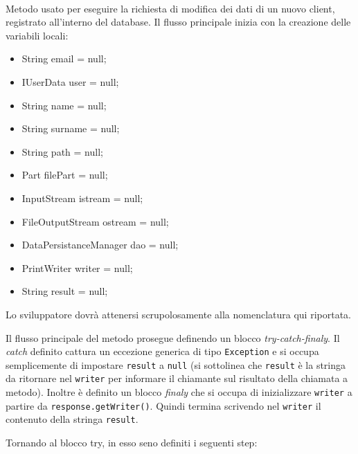 \begin{description}
	\item{}\\	
	Metodo usato per eseguire la richiesta di modifica dei dati di un nuovo client, registrato all'interno del database. Il flusso principale inizia con la creazione delle variabili locali:

\begin{itemize}
\item String email = null;
\item IUserData user = null;
\item String name = null;
\item String surname = null;
\item String path = null;
\item Part filePart = null;
\item InputStream istream = null;
\item FileOutputStream ostream = null;
\item DataPersistanceManager dao = null;
\item PrintWriter writer = null;
\item String result = null;
\end{itemize}	

Lo sviluppatore dovrà attenersi scrupolosamente alla nomenclatura qui riportata.

Il flusso principale del metodo prosegue definendo un blocco \textit{try-catch-finaly}. Il \textit{catch} definito cattura un eccezione generica di tipo \texttt{Exception} e si occupa semplicemente di impostare \texttt{result} a \texttt{null} (si sottolinea che \texttt{result} è la stringa da ritornare nel \texttt{writer} per informare il chiamante sul risultato della chiamata a metodo). Inoltre è definito un blocco \textit{finaly} che si occupa di inizializzare \texttt{writer} a partire da \texttt{response.getWriter()}. Quindi termina scrivendo nel \texttt{writer} il contenuto della stringa \texttt{result}.

Tornando al blocco try, in esso seno definiti i seguenti step:


\end{description}
